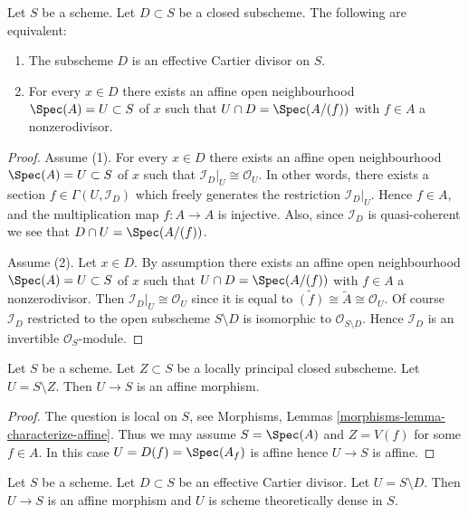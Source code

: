 \begin{lemma}
\label{lemma-characterize-effective-Cartier-divisor}
Let $S$ be a scheme.
Let $D \subset S$ be a closed subscheme.
The following are equivalent:
\begin{enumerate}
\item The subscheme $D$ is an effective Cartier divisor on $S$.
\item For every $x \in D$ there exists an affine open neighbourhood
$\Spec(A) = U \subset S$ of $x$ such that
$U \cap D = \Spec(A/(f))$ with $f \in A$ a nonzerodivisor.
\end{enumerate}
\end{lemma}

\begin{proof}
Assume (1).  For every $x \in D$ there exists an affine open neighbourhood
$\Spec(A) = U \subset S$ of $x$ such that
$\mathcal{I}_D|_U \cong \mathcal{O}_U$. In other words, there exists
a section $f \in \Gamma(U, \mathcal{I}_D)$ which freely generates the
restriction $\mathcal{I}_D|_U$. Hence $f \in A$, and the multiplication
map $f : A \to A$ is injective. Also, since $\mathcal{I}_D$ is
quasi-coherent we see that $D \cap U = \Spec(A/(f))$.

\medskip\noindent
Assume (2). Let $x \in D$. By assumption there exists an affine open
neighbourhood $\Spec(A) = U \subset S$ of $x$ such that
$U \cap D = \Spec(A/(f))$ with $f \in A$ a nonzerodivisor.
Then $\mathcal{I}_D|_U \cong \mathcal{O}_U$ since it is equal to
$\widetilde{(f)} \cong \widetilde{A} \cong \mathcal{O}_U$.
Of course $\mathcal{I}_D$ restricted to the open subscheme
$S \setminus D$ is isomorphic to $\mathcal{O}_{S \setminus D}$.
Hence $\mathcal{I}_D$ is an invertible $\mathcal{O}_S$-module.
\end{proof}

\begin{lemma}
\label{lemma-complement-locally-principal-closed-subscheme}
Let $S$ be a scheme. Let $Z \subset S$ be a locally principal closed
subscheme. Let $U = S \setminus Z$. Then $U \to S$ is an affine morphism.
\end{lemma}

\begin{proof}
The question is local on $S$, see
Morphisms, Lemmas \ref{morphisms-lemma-characterize-affine}.
Thus we may assume $S = \Spec(A)$ and $Z = V(f)$ for some $f \in A$.
In this case $U = D(f) = \Spec(A_f)$ is affine hence $U \to S$ is affine.
\end{proof}

\begin{lemma}
\label{lemma-complement-effective-Cartier-divisor}
Let $S$ be a scheme. Let $D \subset S$ be an effective Cartier divisor.
Let $U = S \setminus D$. Then $U \to S$ is an affine morphism and $U$
is scheme theoretically dense in $S$.
\end{lemma}

